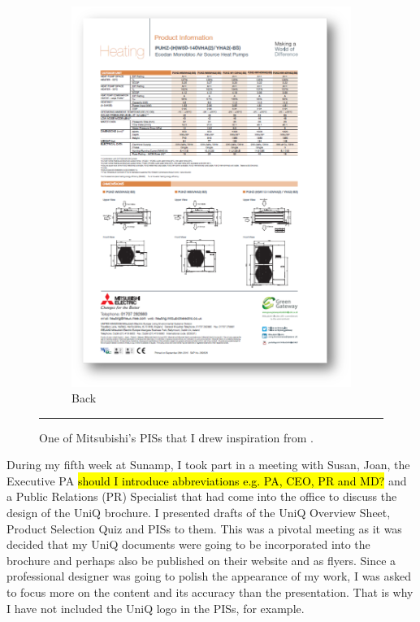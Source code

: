 \begin{figure}[htbp]
\begin{subfigure}{.485\textwidth}
          \includegraphics[width=\textwidth]{figures/Mitsubishi02.png}
          \caption{Back}
          \label{mitsubishi01}
        \end{subfigure}
    \rule{\textwidth}{0.5pt} %
    \caption{One of Mitsubishi's PISs that I drew inspiration from \citep{ref:Mitsubishi}.}
    \label{mitsubishi}
\end{figure}


During my fifth week at Sunamp, I took part in a meeting with Susan, Joan, the Executive PA \hl{should I introduce abbreviations e.g. PA, CEO, PR and MD?} and a Public Relations (PR) Specialist that had come into the office to discuss the design of the UniQ brochure.
I presented drafts of the UniQ Overview Sheet, Product Selection Quiz and PISs to them.
This was a pivotal meeting as it was decided that my UniQ documents were going to be incorporated into the brochure and perhaps also be published on their website and as flyers.
Since a professional designer was going to polish the appearance of my work, I was asked to focus more on the content and its accuracy than the presentation.
That is why I have not included the UniQ logo in the PISs, for example.

